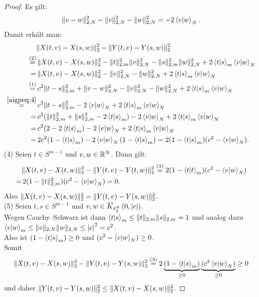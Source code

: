 \begin{proof}
Es gilt:
\begin{align}
\lVert v-w\rVert_{2, N}^2-\lVert v\rVert_{2, N}^2 - \lVert w\rVert_{2, N}^2
= - 2 \left\langle v |w\right\rangle_N\text.\label{aigpeq:4}
\end{align}
Damit erhält man:
\begin{align*}
&\lVert X(t, v) - X(s, w)\rVert_2^2 - \lVert Y(t, v) - Y(s, w)\rVert_2^2\\
\overset{(2)}=&
\,\lVert X(t, v) - X(s, w)\rVert_2^2- \lVert t\rVert _{2,m}^2\lVert v\rVert_{2,N}^2
 - \lVert s\rVert_{2,m}^2\lVert w\rVert_{2,N}^2
	  + 2\left\langle t |s\right\rangle _m\left\langle v |w\right\rangle_N\\
=&\, \lVert X(t, v) - X(s, w)\rVert_2^2 - \lVert v\rVert_{2,N}^2 -
 \lVert w\rVert_{2,N}^2+ 2\left\langle t |s\right\rangle _m\left\langle v |w\right\rangle_N\\
\overset{(1)}=&\,c^2\lVert t-s\rVert_{2,m}^2 + \lVert v-w\rVert_{2,N}^2 - \lVert v\rVert_{2,N}^2 -
 \lVert w\rVert_{2,N}^2+ 2\left\langle t |s\right\rangle _m\left\langle v |w\right\rangle_N\\
\overset{\eqref{aigpeq:4}}=& \,c^2\lVert t-s\rVert_{2,m}^2 - 2 \left\langle v |w\right\rangle_N
 + 2\left\langle t |s\right\rangle _m\left\langle v |w\right\rangle_N\\
=&\, c^2(\lVert t\rVert _{2,m}^2 + \lVert s\rVert_{2, m}^2 - 2\left\langle t |s\right\rangle_m)- 2 \left\langle v |w\right\rangle_N
+ 2\left\langle t |s\right\rangle _m\left\langle v |w\right\rangle_N\\
=&\, c^2(2 -2\left\langle t |s\right\rangle_m) - 2 \left\langle v |w\right\rangle_N + 2\left\langle t |s\right\rangle _m\left\langle v |w\right\rangle_N\\
=&\, 2c^2(1-\left\langle t |s\right\rangle _m) - 2 \left\langle v |w\right\rangle_N(1-\left\langle t |s\right\rangle_m)
= 2(1-\left\langle t |s\right\rangle_m)(c^2-\left\langle v |w\right\rangle_N)\text.
\end{align*}
(4) Seien $t \in S^{m-1}$ und $v, w \in \mathbb{R}^N$. Dann gilt:
\begin{align*}
&\lVert X(t, v) - X(t, w)\rVert_2^2 - \lVert Y(t, v) - Y(t, w)\rVert_2^2
\overset{(3)}= 2(1-\left\langle t |t\right\rangle_m)(c^2- \left\langle v |w\right\rangle_N)\\
=&\, 2(1-\lVert t\rVert_{2,m}^2)(c^2-\left\langle v |w\right\rangle_N)= 0\text.
\end{align*}
Also $\lVert X(t, v) - X(s, w)\rVert_2^2 = \lVert Y(t, v) - Y(s, w)\rVert_2^2$.\\
(5) Seien $t, s \in S^{m-1}$ und $v, w \in \overline K_{\ell_2^N}\left(0, \left|c\right|\right)$.\\
Wegen Cauchy--Schwarz ist dann
$\left\langle t |s\right\rangle _m \le \lVert t\rVert _{2,m} \lVert s\rVert_{2,m} = 1$ und analog dazu
$\left\langle v |w\right\rangle_m \le \lVert v\rVert_{2,N}\lVert w\rVert_{2, N} \le \left|c\right|^2 = c^2$.\\
Also ist $(1-\left\langle t |s\right\rangle_m) \ge 0$ und $(c^2- \left\langle v |w\right\rangle_N) \ge 0$.\\
Somit
\[\lVert X(t, v) - X(s, w)\rVert_2^2 - \lVert Y(t, v) - Y(s, w)\rVert_2^2
\overset{(3)}= 2\underbrace{(1-\left\langle t |s\right\rangle_m)}_{\ge 0}
\underbrace{(c^2 \left\langle v |w\right\rangle_N)}_{\ge 0} \ge 0 \]
und daher $\lVert Y(t, v) - Y(s, w)\rVert_2^2 \le \lVert X(t, v) - X(s, w)\rVert_2^2$.
\end{proof}